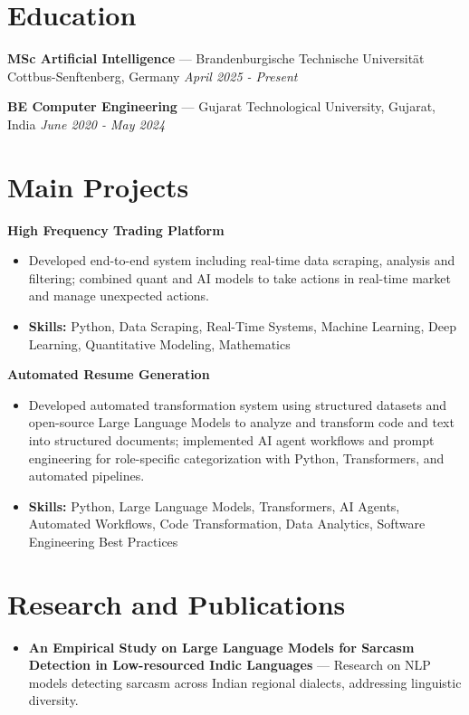 \documentclass[a4paper,10pt]{article}
\begin{document}
\section*{Education}
\textbf{MSc Artificial Intelligence} — Brandenburgische Technische Universität Cottbus-Senftenberg, Germany \hfill \textit{April 2025 - Present}\par
\vspace{1.5pt}
\textbf{BE Computer Engineering} — Gujarat Technological University, Gujarat, India \hfill \textit{June 2020 - May 2024}\par

\section*{Main Projects}
\textbf{High Frequency Trading Platform}\par
\vspace{1pt}
\begin{itemize}
  \item Developed end-to-end system including real-time data scraping, analysis and filtering; combined quant and AI models to take actions in real-time market and manage unexpected actions.
  \item \textbf{Skills:} Python, Data Scraping, Real-Time Systems, Machine Learning, Deep Learning, Quantitative Modeling, Mathematics
\end{itemize}
\vspace{3pt}
\textbf{Automated Resume Generation}\par
\vspace{1pt}
\begin{itemize}
  \item Developed automated transformation system using structured datasets and open-source Large Language Models to analyze and transform code and text into structured documents; implemented AI agent workflows and prompt engineering for role-specific categorization with Python, Transformers, and automated pipelines.
  \item \textbf{Skills:} Python, Large Language Models, Transformers, AI Agents, Automated Workflows, Code Transformation, Data Analytics, Software Engineering Best Practices
\end{itemize}

\section*{Research and Publications}
\begin{itemize}
\item \textbf{An Empirical Study on Large Language Models for Sarcasm Detection in Low-resourced Indic Languages} — Research on NLP models detecting sarcasm across Indian regional dialects, addressing linguistic diversity.
\end{itemize}
\end{document}
